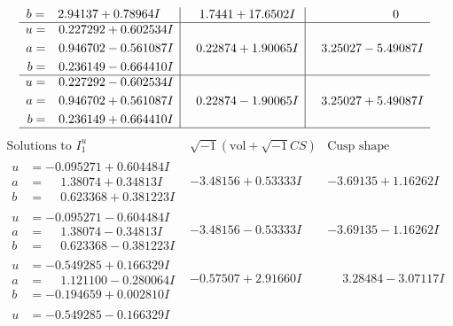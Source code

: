 \documentclass[1p]{elsarticle_modified}
\theoremstyle{definition}
\newcommand{\I}{\sqrt{-1}}
\begin{document}
$$\begin{array}{c|c|c}
\begin{aligned}
b &= \phantom{-}2.94137 + 0.78964 I\end{aligned}
 & \phantom{-}1.7441 + 17.6502 I & \phantom{-0.000000 } 0 \\ \hline\begin{aligned}
u &= \phantom{-}0.227292 + 0.602534 I \\
a &= \phantom{-}0.946702 - 0.561087 I \\
b &= \phantom{-}0.236149 - 0.664410 I\end{aligned}
 & \phantom{-}0.22874 + 1.90065 I & \phantom{-}3.25027 - 5.49087 I \\ \hline\begin{aligned}
u &= \phantom{-}0.227292 - 0.602534 I \\
a &= \phantom{-}0.946702 + 0.561087 I \\
b &= \phantom{-}0.236149 + 0.664410 I\end{aligned}
 & \phantom{-}0.22874 - 1.90065 I & \phantom{-}3.25027 + 5.49087 I\\
 \hline 
 \end{array}$$\newpage$$\begin{array}{c|c|c}  
\text{Solutions to }I^u_{1}& \I (\text{vol} + \sqrt{-1}CS) & \text{Cusp shape}\\
 \hline 
\begin{aligned}
u &= -0.095271 + 0.604484 I \\
a &= \phantom{-}1.38074 + 0.34813 I \\
b &= \phantom{-}0.623368 + 0.381223 I\end{aligned}
 & -3.48156 + 0.53333 I & -3.69135 + 1.16262 I \\ \hline\begin{aligned}
u &= -0.095271 - 0.604484 I \\
a &= \phantom{-}1.38074 - 0.34813 I \\
b &= \phantom{-}0.623368 - 0.381223 I\end{aligned}
 & -3.48156 - 0.53333 I & -3.69135 - 1.16262 I \\ \hline\begin{aligned}
u &= -0.549285 + 0.166329 I \\
a &= \phantom{-}1.121100 - 0.280064 I \\
b &= -0.194659 + 0.002810 I\end{aligned}
 & -0.57507 + 2.91660 I & \phantom{-}3.28484 - 3.07117 I \\ \hline\begin{aligned}
u &= -0.549285 - 0.166329 I \\

\end{aligned}
\end{array}$$
\end{document}
